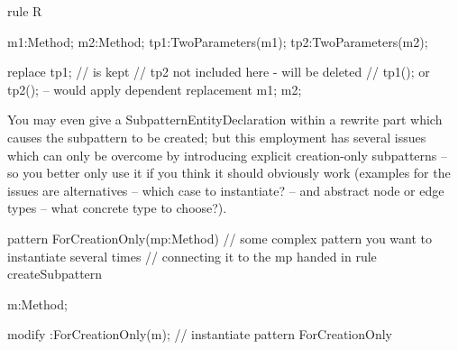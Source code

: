 \begin{example}
  \begin{grgen}
rule R {
  m1:Method; m2:Method;
  tp1:TwoParameters(m1);
  tp2:TwoParameters(m2);

  replace {
    tp1; // is kept
    // tp2 not included here - will be deleted
    // tp1(); or tp2(); -- would apply dependent replacement
    m1; m2;
  }
}
  \end{grgen}
\end{example}

\begin{note}
You may even give a SubpatternEntityDeclaration within a rewrite part which causes the subpattern to be created; 
but this employment has several issues which can only be overcome by introducing explicit creation-only subpatterns
-- so you better only use it if you think it should obviously work (examples for the issues are alternatives -- which case to instantiate? -- and abstract node or edge types -- what concrete type to choose?). 

  \begin{grgen}
pattern ForCreationOnly(mp:Method)
{
  // some complex pattern you want to instantiate several times 
  // connecting it to the mp handed in
}
rule createSubpattern
{
  m:Method;
  
  modify {
    :ForCreationOnly(m); // instantiate pattern ForCreationOnly
  }
}
  \end{grgen}
\end{note}

